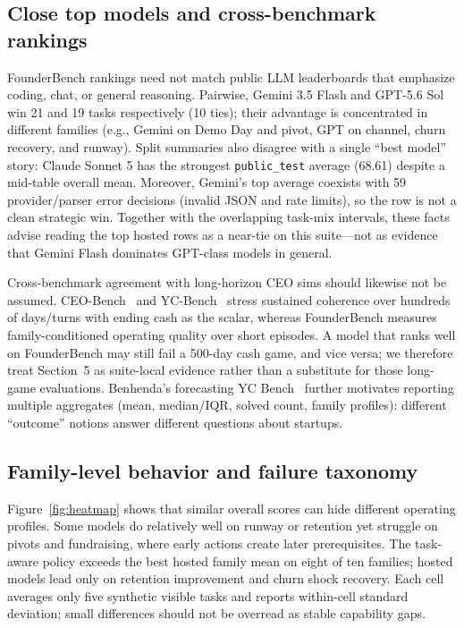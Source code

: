 \documentclass[sigconf,review]{acmart}
\begin{document}
\subsection{Close top models and cross-benchmark rankings}
FounderBench rankings need not match public LLM leaderboards that emphasize coding, chat, or general reasoning.
Pairwise, Gemini 3.5 Flash and GPT-5.6 Sol win 21 and 19 tasks respectively (10 ties); their advantage is concentrated in different families (e.g., Gemini on Demo Day and pivot, GPT on channel, churn recovery, and runway).
Split summaries also disagree with a single ``best model'' story: Claude Sonnet 5 has the strongest \texttt{public\_test} average (68.61) despite a mid-table overall mean.
Moreover, Gemini's top average coexists with 59 provider/parser error decisions (invalid JSON and rate limits), so the row is not a clean strategic win.
Together with the overlapping task-mix intervals, these facts advise reading the top hosted rows as a near-tie on this suite---not as evidence that Gemini Flash dominates GPT-class models in general.

Cross-benchmark agreement with long-horizon CEO sims should likewise not be assumed.
CEO-Bench~\cite{chen2026ceobench} and YC-Bench~\cite{he2026ycbench} stress sustained coherence over hundreds of days/turns with ending cash as the scalar, whereas FounderBench measures family-conditioned operating quality over short episodes.
A model that ranks well on FounderBench may still fail a 500-day cash game, and vice versa; we therefore treat Section~5 as suite-local evidence rather than a substitute for those long-game evaluations.
Benhenda's forecasting YC Bench~\cite{benhenda2026ycbenchforecast} further motivates reporting multiple aggregates (mean, median/IQR, solved count, family profiles): different ``outcome'' notions answer different questions about startups.

\subsection{Family-level behavior and failure taxonomy}
Figure~\ref{fig:heatmap} shows that similar overall scores can hide different operating profiles.
Some models do relatively well on runway or retention yet struggle on pivots and fundraising, where early actions create later prerequisites.
The task-aware policy exceeds the best hosted family mean on eight of ten families; hosted models lead only on retention improvement and churn shock recovery.
Each cell averages only five synthetic visible tasks and reports within-cell standard deviation; small differences should not be overread as stable capability gaps.
\end{document}
